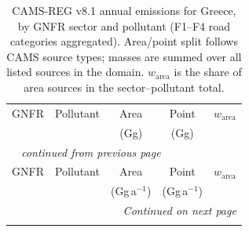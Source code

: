 \begingroup
\footnotesize
\setlength{\tabcolsep}{5pt}
\begin{longtable}{@{}llrrr@{}}
\caption[CAMS-REG v8.1 emissions for Greece in 2019]{CAMS\mbox{-}REG v8.1 annual emissions for Greece, by GNFR sector and pollutant (F1--F4 road categories aggregated). Area/point split follows CAMS source types; masses are summed over all listed sources in the domain. $w_{\mathrm{area}}$ is the share of area sources in the sector--pollutant total.}
\label{tab:greece_cams_emis_2019} \\
\toprule
GNFR & Pollutant & \multicolumn{1}{c}{Area} & \multicolumn{1}{c}{Point} & $w_{\mathrm{area}}$ \\
 & & \multicolumn{1}{c}{(Gg)} & \multicolumn{1}{c}{(Gg)} & \\
\midrule
\endfirsthead

\multicolumn{5}{l}{\textit{\tablename\ \thetable{} continued from previous page}} \\
\toprule
GNFR & Pollutant & \multicolumn{1}{c}{Area} & \multicolumn{1}{c}{Point} & $w_{\mathrm{area}}$ \\
 & & \multicolumn{1}{c}{(Gg\,a$^{-1}$)} & \multicolumn{1}{c}{(Gg\,a$^{-1}$)} & \\
\midrule
\endhead

\midrule
\multicolumn{5}{r}{\textit{Continued on next page}} \\
\endfoot

\bottomrule
\endlastfoot


\end{longtable}
